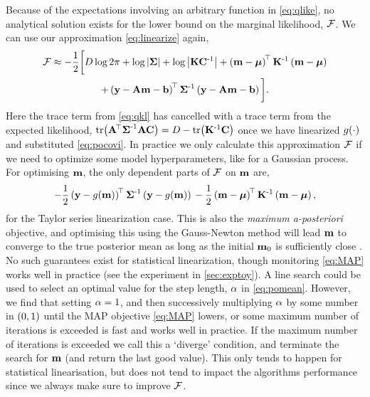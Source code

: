 \documentclass{article} %
\begin{document}
Because of the expectations involving an arbitrary function in
\eqref{eq:qlike}, no analytical solution exists for the lower bound on the
marginal likelihood, $\mathcal{F}$. We can use our approximation
\eqref{eq:linearize} again,
\begin{multline}
    \mathcal{F} \approx - \frac{1}{2} \bigg[
        D\log{2\pi} + \log\left|{\boldsymbol{\Sigma}}\right| + \log\left|{\mathbf{K}\mathbf{C}^{\text{-}1}}\right|
    + \left({\mathbf{m} - \boldsymbol{\mu}}\right)^{\!\top}\mathbf{K}^{\text{-}1}
        \left({\mathbf{m} - \boldsymbol{\mu}}\right) \\
    + \left({\mathbf{y} - \mathbf{A}\mathbf{m} - \mathbf{b}}\right)^{\!\top}\boldsymbol{\Sigma}^{\text{-}1}
        \left({\mathbf{y} - \mathbf{A}\mathbf{m} - \mathbf{b}}\right)
        \bigg].
    \label{eq:approxfengy}
\end{multline}
Here the trace term from \eqref{eq:qkl} has cancelled with a trace term from
the expected likelihood, $\text{tr}\!\left({\mathbf{A}^{\!\top}\boldsymbol{\Sigma}^{\text{-}1}\mathbf{A}\mathbf{C}}\right) = D -
\text{tr}\!\left({\mathbf{K}^{\text{-}1}\mathbf{C}}\right)$ once we have linearized $g\!\left({{\cdot}}\right)$ and
substituted \eqref{eq:pocovi}. In practice we only calculate this approximation
$\mathcal{F}$ if we need to optimize some model hyperparameters, like for a Gaussian
process. For optimising $\mathbf{m}$, the only dependent parts of $\mathcal{F}$ on
$\mathbf{m}$ are,
\begin{equation}
    -\frac{1}{2} \left({\mathbf{y} - g\!\left({{\mathbf{m}}}\right)}\right)^{\!\top}
            \boldsymbol{\Sigma}^{\text{-}1}
            \left({\mathbf{y} - g\!\left({{\mathbf{m}}}\right)}\right) \\
    -\frac{1}{2}
        \left({\mathbf{m} - \boldsymbol{\mu}}\right)^{\!\top}
        \mathbf{K}^{\text{-}1}
        \left({\mathbf{m} - \boldsymbol{\mu}}\right),
    \label{eq:MAP}
\end{equation}
for the Taylor series linearization case. This is also the \emph{maximum
    a-posteriori} objective, and optimising this using the Gauss-Newton method
will lead $\mathbf{m}$ to converge to the true posterior mean as long as the
initial $\mathbf{m}_0$ is sufficiently close \cite{Nocedal2006}. No such
guarantees exist for statistical linearization, though monitoring
\eqref{eq:MAP} works well in practice (see the experiment in
\autoref{sec:exptoy}). A line search could be used to select an optimal value
for the step length, $\alpha$ in \eqref{eq:pomean}. However, we find that
setting $\alpha=1$, and then successively multiplying $\alpha$ by some number in
$\left({0, 1}\right)$ until the MAP objective \eqref{eq:MAP} lowers, or some maximum
number of iterations is exceeded is fast and works well in practice. If the
maximum number of iterations is exceeded we call this a `diverge' condition,
and terminate the search for $\mathbf{m}$ (and return the last good value). This
only tends to happen for statistical linearisation, but does not tend to impact
the algorithms performance since we always make sure to improve $\mathcal{F}$.
\end{document}

